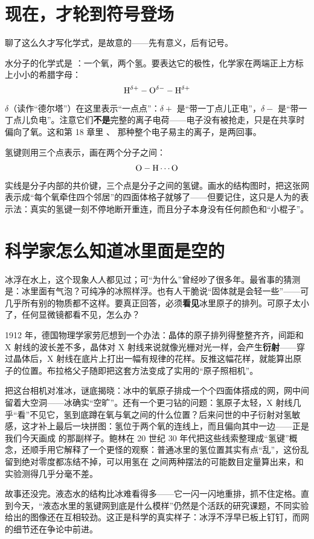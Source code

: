 \section{现在，才轮到符号登场}

聊了这么久才写化学式，是故意的——先有意义，后有记号。

水分子的化学式是 ：一个氧，两个氢。要表达它的极性，化学家在两端正上方标上小小的希腊字母：
\[\mathrm{H^{\delta+}-O^{\delta-}-H^{\delta+}}\]
$\delta$（读作“德尔塔”）在这里表示“一点点”：$\delta+$ 是“带一丁点儿正电”，$\delta-$ 是“带一丁点儿负电”。注意它们\textbf{不是}完整的离子电荷——电子没有被抢走，只是在共享时偏向了氧。这和第 18 章里 、 那种整个电子易主的离子，是两回事。

氢键则用三个点表示，画在两个分子之间：
\[\mathrm{O-H\cdots O}\]
实线是分子内部的共价键，三个点是分子之间的氢键。画水的结构图时，把这张网表示成“每个氧牵住四个邻居”的四面体格子就够了——但要记住，这只是人为的表示法：真实的氢键一刻不停地断开重连，而且分子本身没有任何颜色和“小棍子”。

\section{科学家怎么知道冰里面是空的}

\begin{zhengju}
冰浮在水上，这个现象人人都见过；可“为什么”曾经吵了很多年。最省事的猜测是：冰里面有气泡？可纯净的冰照样浮。也有人干脆说“固体就是会轻一些”——可几乎所有别的物质都不这样。要真正回答，必须\textbf{看见}冰里原子的排列。可原子太小了，任何显微镜都看不见，怎么办？

1912 年，德国物理学家劳厄想到一个办法：晶体的原子排列得整整齐齐，间距和 X 射线的波长差不多，晶体对 X 射线来说就像光栅对光一样，会产生\textbf{衍射}——穿过晶体后，X 射线在底片上打出一幅有规律的花样。反推这幅花样，就能算出原子的位置。布拉格父子随即把这套方法变成了实用的“原子照相机”。

把这台相机对准冰，谜底揭晓：冰中的氧原子排成一个个四面体搭成的网，网中间留着大空洞——冰确实“空旷”。还有一个更刁钻的问题：氢原子太轻，X 射线几乎“看”不见它，氢到底蹲在氧与氧之间的什么位置？后来问世的中子衍射对氢敏感，这才补上最后一块拼图：氢位于两个氧的连线上，而且偏向其中一边——正是我们今天画成  的那副样子。鲍林在 20 世纪 30 年代把这些线索整理成“氢键”概念，还顺手用它解释了一个更怪的观察：普通冰里的氢位置其实有点“乱”，这份乱留到绝对零度都冻结不掉，可以用氢在  之间两种摆法的可能数目定量算出来，和实验测得几乎分毫不差。

故事还没完。液态水的结构比冰难看得多——它一闪一闪地重排，抓不住定格。直到今天，“液态水里的氢键网到底是什么模样”仍然是个活跃的研究课题，不同实验给出的图像还在互相较劲。这正是科学的真实样子：冰浮不浮早已板上钉钉，而网的细节还在争论中前进。
\end{zhengju}

